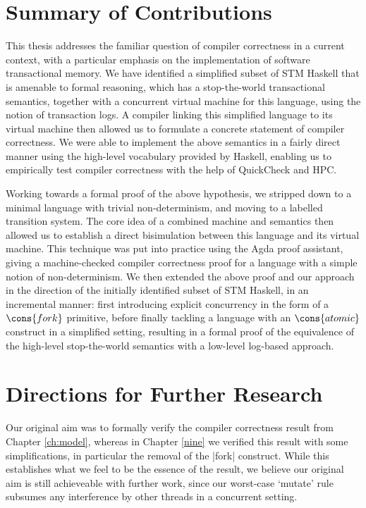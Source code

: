
\section{Summary of Contributions}%

This thesis addresses the familiar question of compiler correctness in
a current context, with a particular emphasis on the implementation of
software transactional memory. We have identified a simplified subset of STM
Haskell that is amenable to formal reasoning, which has a stop-the-world
transactional semantics, together with a concurrent virtual machine for this
language, using the notion of transaction logs. A compiler linking this
simplified language to its virtual machine then allowed us to formulate
a concrete statement of compiler correctness. We were able to implement the
above semantics in a fairly direct manner using the high-level vocabulary
provided by Haskell, enabling us to empirically test compiler correctness
with the help of QuickCheck and HPC.

Working towards a formal proof of the above hypothesis, we stripped down to
a minimal language with trivial non-determinism, and moving to a labelled
transition system. The core idea of a combined machine and semantics then
allowed us to establish a direct bisimulation between this language and its
virtual machine. This technique was put into practice using the Agda proof
assistant, giving a machine-checked compiler correctness proof for
a language with a simple notion of non-determinism. We then extended the
above proof and our approach in the direction of the initially identified
subset of STM Haskell, in an incremental manner: first introducing explicit
concurrency in the form of a $\cons{fork}$ primitive, before finally
tackling a language with an $\cons{atomic}$ construct in a simplified
setting, resulting in a formal proof of the equivalence of the high-level
stop-the-world semantics with a low-level log-based approach.


\section{Directions for Further Research}%

Our original aim was to formally verify the compiler correctness result from
Chapter \ref{ch:model}, whereas in Chapter \ref{nine} we verified this
result with some simplifications, in particular the removal of the |fork|
construct. While this establishes what we feel to be the essence of the
result, we believe our original aim is still achieveable with further work,
since our worst-case `mutate' rule subsumes any interference by other
threads in a concurrent setting.

